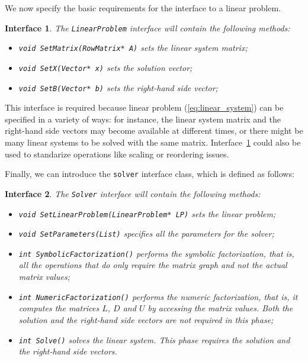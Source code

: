 \documentclass[acmtocl]{acmtrans2m}
\newtheorem{interface}{Interface}[section]
\begin{document}
We now specify the basic requirements for the interface to a linear problem.
\begin{interface}
\label{int:lp}
The {\tt LinearProblem} interface
will contain the following methods:
\begin{itemize}
\item \verb!void SetMatrix(RowMatrix* A)! sets the linear system matrix;
\item \verb!void SetX(Vector* x)! sets the solution vector;
\item \verb!void SetB(Vector* b)! sets the right-hand side vector;
\end{itemize}
\end{interface}
This interface is required because linear problem (\ref{eq:linear_system}) can
be specified in a variety of ways: for instance,
the linear system matrix and the right-hand side vectors may become
available at different times, or
there might be many linear systems to be solved with the same matrix.
Interface~\ref{int:lp} could also be used to standarize operations like
scaling or reordering issues.



\smallskip

Finally, we can introduce the {\tt solver} interface class, which is defined as
follows:
\begin{interface}
\label{int:asi}
The {\tt Solver} interface
will contain the following methods:
\begin{itemize}
\item \verb!void SetLinearProblem(LinearProblem* LP)! sets the linear problem;
\item \verb!void SetParameters(List)! specifies all the parameters for the solver;
\item \verb!int SymbolicFactorization()! performs the symbolic factorization, that
is, all the operations that do only require the matrix graph and not the
actual matrix values;
\item \verb!int NumericFactorization()! performs the numeric factorization, that
is, it computes the matrices $L$, $D$ and $U$ by accessing the matrix values.
Both the solution and the right-hand side vectors are not required in this phase;
\item \verb!int Solve()! solves the linear system. This phase requires the
solution and the right-hand side vectors.
\end{itemize}
\end{interface}
\end{document}
